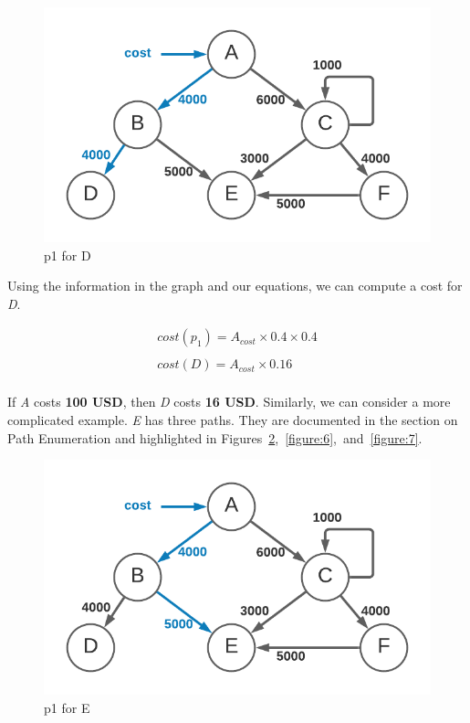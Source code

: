 \documentclass[10pt, a4paper, twocolumn]{article}
\begin{document}
      \begin{figure}[H]
        \centering
        \includegraphics[width=\linewidth]{./cost-attribution-cost-d.png}
        \caption{p1 for D}
        \label{figure:4}
      \end{figure}

      Using the information in the graph and our equations, we can compute a cost for \textit{D}.

      \begin{gather*}
        cost(p_{1}) = A_{cost} \times 0.4 \times 0.4 \\
        \\
        cost(D) = A_{cost} \times 0.16 \\
      \end{gather*}

      If \textit{A} costs \textbf{100 USD}, then \textit{D} costs \textbf{16 USD}.
      Similarly, we can consider a more complicated example.
      \textit{E} has three paths.
      They are documented in the section on Path Enumeration and
      highlighted in Figures~\ref{figure:5},~\ref{figure:6},~and~\ref{figure:7}.

      \begin{figure}[H]
        \centering
        \includegraphics[width=\linewidth]{./cost-attribution-cost-ep1.png}
        \caption{p1 for E}
        \label{figure:5}
      \end{figure}
\end{document}
